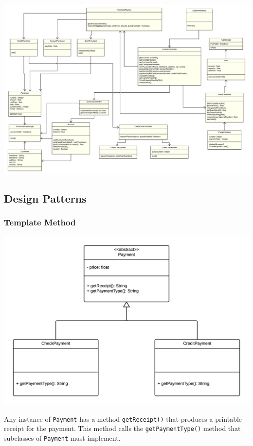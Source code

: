 \documentclass[11pt, a4paper]{article}
\newcommand{\settextlisting}{\lstset{ basicstyle=\small\ttfamily }}
\begin{document}
\begin{center}
\centerline{\includegraphics[angle=90, origin=c, width=1\textwidth]{use.png}}
\end{center}

\subsection*{Design Patterns}

\subsubsection{Template Method}

\includegraphics[width=\textwidth]{TemplateMethodPattern.png}

\medskip
\settextlisting
Any instance of \lstinline|Payment| has a method \lstinline|getReceipt()| that produces a printable receipt for the payment.
This method calls the \lstinline|getPaymentType()| method that subclasses of \lstinline|Payment| must implement.
\end{document}
